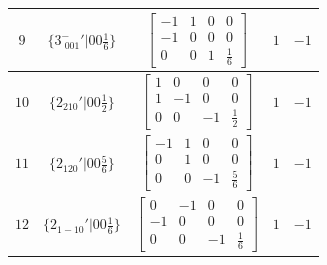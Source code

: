 \documentclass[fleqn,8pt]{jsarticle}
\begin{document}
\begin{longtable}{ccccc}
$ 9 $ & $ \{3^{-}_{\,\,001}{}'|0 0 \frac{1}{6}\} $ & $ \begin{bmatrix} -1 & 1 & 0 & 0 \\ -1 & 0 & 0 & 0 \\ 0 & 0 & 1 & \frac{1}{6} \end{bmatrix} $ & $ 1 $ & $ -1 $ \\ \hline
$ 10 $ & $ \{2{}_{210}{}'|0 0 \frac{1}{2}\} $ & $ \begin{bmatrix} 1 & 0 & 0 & 0 \\ 1 & -1 & 0 & 0 \\ 0 & 0 & -1 & \frac{1}{2} \end{bmatrix} $ & $ 1 $ & $ -1 $ \\ \hline
$ 11 $ & $ \{2{}_{120}{}'|0 0 \frac{5}{6}\} $ & $ \begin{bmatrix} -1 & 1 & 0 & 0 \\ 0 & 1 & 0 & 0 \\ 0 & 0 & -1 & \frac{5}{6} \end{bmatrix} $ & $ 1 $ & $ -1 $ \\ \hline
$ 12 $ & $ \{2{}_{1-10}{}'|0 0 \frac{1}{6}\} $ & $ \begin{bmatrix} 0 & -1 & 0 & 0 \\ -1 & 0 & 0 & 0 \\ 0 & 0 & -1 & \frac{1}{6} \end{bmatrix} $ & $ 1 $ & $ -1 $ \\
\end{longtable}
\end{document}
